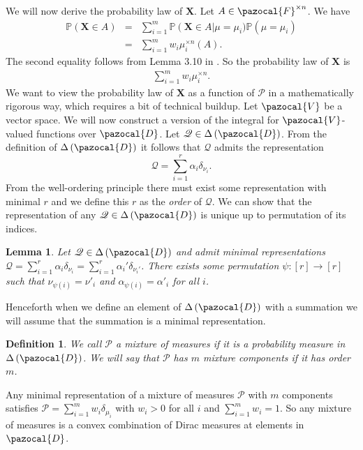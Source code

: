 \documentclass[aos]{imsart}
\def\sF{\pazocal{F}}
\def\sD{\pazocal{D}}
\def\sV{\pazocal{V}}
\def\sP{\mathscr{P}}
\def\sQ{\mathscr{Q}}
\def\bX{\mathbf{X}}
\def\pr{\mathbb{P}}
\def\dd{\Delta\left( \sD \right)}
\theoremstyle{plain}
\newtheorem{lem}{Lemma}[section]
\theoremstyle{defintion}
\newtheorem{defin}{Definition}[section]
\begin{document}
	We will now derive the probability law of $\bX$. Let $A\in \sF^{\times n}$. We have
	\begin{eqnarray*}
		\pr\left(\bX \in A \right)
		&=& \sum_{i=1}^m \pr\left( \bX \in A \right|\mu=\mu_i) \pr\left( \mu=\mu_i \right)\\
	 &=&  \sum_{i=1}^m w_i \mu_i^{\times n}\left( A \right).
	\end{eqnarray*}
	The second equality follows from Lemma 3.10 in \cite{fomp}.
	So the probability law of $\bX$ is 
	\begin{eqnarray}
		\label{xdens}
		\sum_{i=1}^m w_i \mu_i^{\times n}. 
	\end{eqnarray}
	We want to view the probability law of $\bX$ as a function of $\sP$ in a mathematically rigorous way, which requires a bit of technical buildup.
	Let $\sV$ be a vector space. We will now construct a version of the integral for $\sV$-valued functions over $\sD$. Let $\sQ\in \dd$. From the definition of $\dd$ it follows that $\sQ$ admits the representation $$\sQ = \sum_{i=1}^r \alpha_i\delta_{\nu_i} .$$
	From the well-ordering principle there must exist some representation with minimal $r$ and we define this $r$ as the {\it order} of $\sQ$. We can show that the representation of any $\sQ \in \dd$ is unique up to permutation of its indices.

	\begin{lem} \label{lem:represent}
		Let $\sQ\in \dd$ and admit minimal representations $\sQ = \sum_{i=1}^r  \alpha_i \delta_{\nu_i}= \sum_{i=1}^r \alpha_i'\delta_{\nu_i'}$. There exists some permutation $\psi:\left[ r \right] \to \left[ r \right]$ such that $\nu_{\psi\left( i \right)} = \nu'_i$ and $\alpha_{\psi\left( i \right)} = \alpha'_i$ for all $i$.
	\end{lem}

	Henceforth when we define an element of $\dd$ with a summation we will assume that the summation is a minimal representation.
	\begin{defin} \label{def:mixmeasure}
		We call $\sP$ a {\em mixture of measures} if it is a probability measure in $\dd$. We will say that $\sP$ has $m$ {\em mixture components} if it has order $m$.
	\end{defin}

	Any minimal representation of a mixture of measures $\sP$ with $m$ components satisfies $\sP=\sum_{i=1}^m w_i \delta_{\mu_i}$ with $w_i>0$ for all $i$ and $\sum_{i=1}^m w_i = 1$. So any mixture of measures is a convex combination of Dirac measures at elements in $\sD$.
\end{document}
